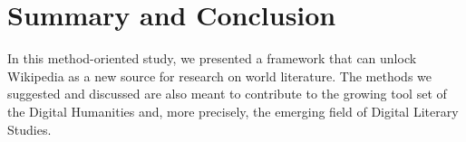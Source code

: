 \documentclass[a4paper,12pt]{scrartcl}
\begin{document}
\section{Summary and Conclusion}\label{sec:conclusion}








In this method-oriented study, we presented a framework that can unlock
Wikipedia as a new source for research on world literature. The methods
we suggested and discussed are also meant to contribute to the growing
tool set of the Digital Humanities and, more precisely, the emerging
field of Digital Literary Studies.
%
\end{document}
